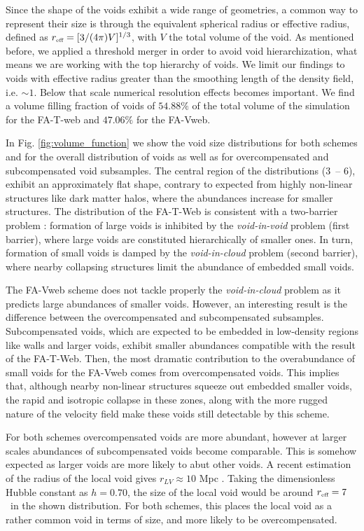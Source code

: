 \documentclass[a4,useAMS,usenatbib,usegraphicx]{mn2e}
\newcommand{\hMpc}{{\ifmmode{h^{-1}{\rm Mpc}}\else{$h^{-1}$Mpc}\fi}}
\newcommand{\reff}{{\ifmmode{r_{\mbox{\tiny eff}}}\else{$r_{\mbox{\tiny eff}}$}\fi}}
\begin{document}
Since the shape of the voids exhibit a wide range of geometries, a common 
way to represent their size is through the equivalent spherical radius or
effective radius, defined as $\reff = [3/(4\pi)V]^{1/3}$, with $V$ the 
total volume of the void. As mentioned before, we applied a threshold merger
in order to avoid void hierarchization, what means we are working with the
top hierarchy of voids. We limit our findings to voids with effective radius
greater than the smoothing length of the density field, i.e. $\sim 1$\hMpc. 
Below that scale numerical resolution effects becomes important. We find a
volume filling fraction of voids of $54.88\%$ of the total volume of the 
simulation for the FA-T-web and $47.06\%$ for the FA-Vweb.


In Fig. \ref{fig:volume_function} we show the void size distributions
for both schemes and for the overall distribution of voids as well as for 
overcompensated and subcompensated void subsamples. The central region of
the distributions ($3$\hMpc\ -- $6$\hMpc), exhibit an approximately flat 
shape, contrary to expected from highly non-linear structures like dark 
matter halos, where the abundances increase for smaller structures. 
The distribution of the FA-T-Web is consistent with a two-barrier problem 
\citep{Sheth04}: formation of large voids is inhibited by the 
\textit{void-in-void} problem (first barrier), where large voids are 
constituted hierarchically of smaller ones. In turn, formation of small 
voids is damped by the \textit{void-in-cloud} problem (second barrier), 
where nearby collapsing structures limit the abundance of embedded small 
voids.


The FA-Vweb scheme does not tackle properly the \textit{void-in-cloud} 
problem as it predicts large abundances of smaller voids. However, an 
interesting result is the difference between the overcompensated and 
subcompensated subsamples. Subcompensated voids, which are expected to 
be embedded in low-density regions like walls and larger voids, exhibit
smaller abundances compatible with the result of the FA-T-Web. Then, the 
most dramatic contribution to the overabundance of small voids for the 
FA-Vweb comes from overcompensated voids. This implies that, although
nearby non-linear structures squeeze out embedded smaller voids, the
rapid and isotropic collapse in these zones, along with the more rugged 
nature of the velocity field make these voids still detectable by this 
scheme.


For both schemes overcompensated voids are more abundant, however at 
larger scales abundances of subcompensated voids become comparable. This 
is somehow expected as larger voids are more likely to abut other voids.
A recent estimation of the radius of the local void gives $r_{LV}\approx
10$ Mpc \citep{Nasonova11}. Taking the dimensionless Hubble constant as 
$h = 0.70$, the size of the local void would be around $\reff = 7$
\hMpc\ in the shown distribution. For both schemes, this places the local
void as a rather common void in terms of size, and more likely to be
overcompensated.
\end{document}
